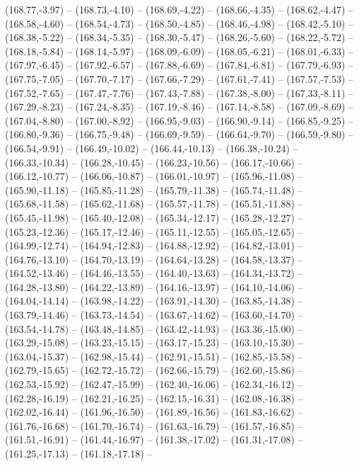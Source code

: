 {  (168.77,-3.97) -- (168.73,-4.10) -- (168.69,-4.22) -- (168.66,-4.35) -- (168.62,-4.47) -- (168.58,-4.60) -- (168.54,-4.73) --
  (168.50,-4.85) -- (168.46,-4.98) -- (168.42,-5.10) -- (168.38,-5.22) -- (168.34,-5.35) -- (168.30,-5.47) -- (168.26,-5.60) --
  (168.22,-5.72) -- (168.18,-5.84) -- (168.14,-5.97) -- (168.09,-6.09) -- (168.05,-6.21) -- (168.01,-6.33) -- (167.97,-6.45) --
  (167.92,-6.57) -- (167.88,-6.69) -- (167.84,-6.81) -- (167.79,-6.93) -- (167.75,-7.05) -- (167.70,-7.17) -- (167.66,-7.29) --
  (167.61,-7.41) -- (167.57,-7.53) -- (167.52,-7.65) -- (167.47,-7.76) -- (167.43,-7.88) -- (167.38,-8.00) -- (167.33,-8.11) --
  (167.29,-8.23) -- (167.24,-8.35) -- (167.19,-8.46) -- (167.14,-8.58) -- (167.09,-8.69) -- (167.04,-8.80) -- (167.00,-8.92) --
  (166.95,-9.03) -- (166.90,-9.14) -- (166.85,-9.25) -- (166.80,-9.36) -- (166.75,-9.48) -- (166.69,-9.59) -- (166.64,-9.70) --
  (166.59,-9.80) -- (166.54,-9.91) -- (166.49,-10.02) -- (166.44,-10.13) -- (166.38,-10.24) -- (166.33,-10.34) -- (166.28,-10.45) --
  (166.23,-10.56) -- (166.17,-10.66) -- (166.12,-10.77) -- (166.06,-10.87) -- (166.01,-10.97) -- (165.96,-11.08) -- (165.90,-11.18) --
  (165.85,-11.28) -- (165.79,-11.38) -- (165.74,-11.48) -- (165.68,-11.58) -- (165.62,-11.68) -- (165.57,-11.78) -- (165.51,-11.88) --
  (165.45,-11.98) -- (165.40,-12.08) -- (165.34,-12.17) -- (165.28,-12.27) -- (165.23,-12.36) -- (165.17,-12.46) -- (165.11,-12.55) --
  (165.05,-12.65) -- (164.99,-12.74) -- (164.94,-12.83) -- (164.88,-12.92) -- (164.82,-13.01) -- (164.76,-13.10) -- (164.70,-13.19) --
  (164.64,-13.28) -- (164.58,-13.37) -- (164.52,-13.46) -- (164.46,-13.55) -- (164.40,-13.63) -- (164.34,-13.72) -- (164.28,-13.80) --
  (164.22,-13.89) -- (164.16,-13.97) -- (164.10,-14.06) -- (164.04,-14.14) -- (163.98,-14.22) -- (163.91,-14.30) -- (163.85,-14.38) --
  (163.79,-14.46) -- (163.73,-14.54) -- (163.67,-14.62) -- (163.60,-14.70) -- (163.54,-14.78) -- (163.48,-14.85) -- (163.42,-14.93) --
  (163.36,-15.00) -- (163.29,-15.08) -- (163.23,-15.15) -- (163.17,-15.23) -- (163.10,-15.30) -- (163.04,-15.37) -- (162.98,-15.44) --
  (162.91,-15.51) -- (162.85,-15.58) -- (162.79,-15.65) -- (162.72,-15.72) -- (162.66,-15.79) -- (162.60,-15.86) -- (162.53,-15.92) --
  (162.47,-15.99) -- (162.40,-16.06) -- (162.34,-16.12) -- (162.28,-16.19) -- (162.21,-16.25) -- (162.15,-16.31) -- (162.08,-16.38) --
  (162.02,-16.44) -- (161.96,-16.50) -- (161.89,-16.56) -- (161.83,-16.62) -- (161.76,-16.68) -- (161.70,-16.74) -- (161.63,-16.79) --
  (161.57,-16.85) -- (161.51,-16.91) -- (161.44,-16.97) -- (161.38,-17.02) -- (161.31,-17.08) -- (161.25,-17.13) -- (161.18,-17.18) --
}
